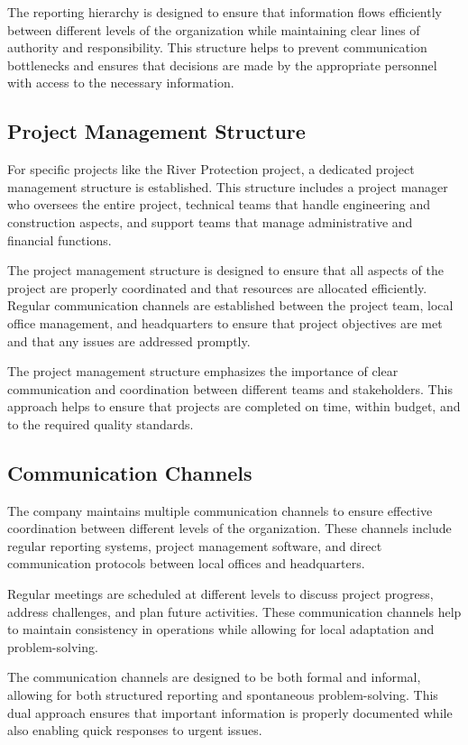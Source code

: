 The reporting hierarchy is designed to ensure that information flows efficiently between different levels of the organization while maintaining clear lines of authority and responsibility. This structure helps to prevent communication bottlenecks and ensures that decisions are made by the appropriate personnel with access to the necessary information.

\subsection{Project Management Structure}
For specific projects like the River Protection project, a dedicated project management structure is established. This structure includes a project manager who oversees the entire project, technical teams that handle engineering and construction aspects, and support teams that manage administrative and financial functions.

The project management structure is designed to ensure that all aspects of the project are properly coordinated and that resources are allocated efficiently. Regular communication channels are established between the project team, local office management, and headquarters to ensure that project objectives are met and that any issues are addressed promptly.

The project management structure emphasizes the importance of clear communication and coordination between different teams and stakeholders. This approach helps to ensure that projects are completed on time, within budget, and to the required quality standards.

\subsection{Communication Channels}
The company maintains multiple communication channels to ensure effective coordination between different levels of the organization. These channels include regular reporting systems, project management software, and direct communication protocols between local offices and headquarters.

Regular meetings are scheduled at different levels to discuss project progress, address challenges, and plan future activities. These communication channels help to maintain consistency in operations while allowing for local adaptation and problem-solving.

The communication channels are designed to be both formal and informal, allowing for both structured reporting and spontaneous problem-solving. This dual approach ensures that important information is properly documented while also enabling quick responses to urgent issues.

